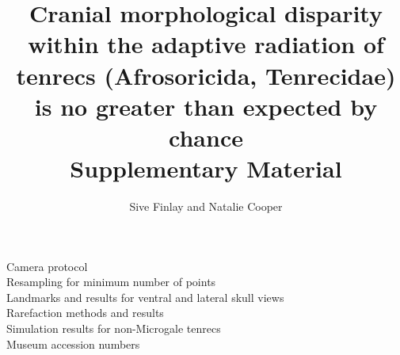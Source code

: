 \documentclass[12pt,a4paper]{article}
\begin{document}
\title{
       Cranial morphological disparity within the adaptive radiation of tenrecs (Afrosoricida, Tenrecidae) is no greater than expected by chance\\
       \bigskip
       Supplementary Material }
\author{Sive Finlay and Natalie Cooper}
\date{}
\maketitle

\linespread{1.6}

Camera protocol\\
Resampling for minimum number of points\\
Landmarks and results for ventral and lateral skull views\\
Rarefaction methods and results\\
Simulation results for non-Microgale tenrecs\\
Museum accession numbers\\




\end{document}
